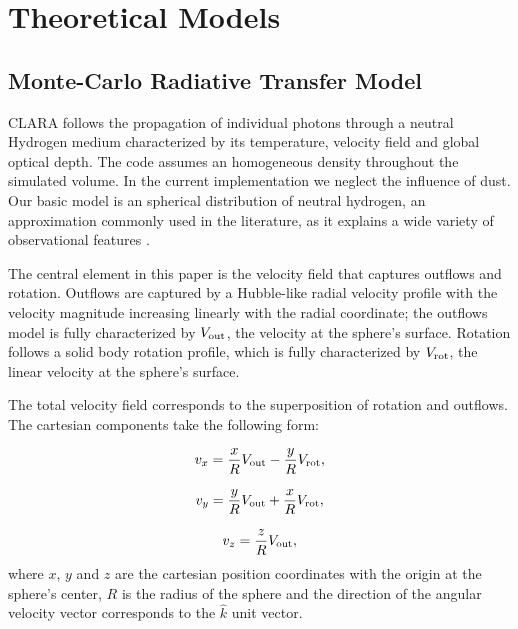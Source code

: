 \documentclass[a4paper,fleqn,usenatbib]{mnras}
\begin{document}
\section{Theoretical Models}
\label{sec:theory}

\subsection{Monte-Carlo Radiative Transfer Model}

CLARA follows the propagation of individual photons through a neutral
Hydrogen medium characterized by its temperature, velocity field and
global optical depth.
The code assumes an homogeneous density throughout the simulated
volume.
In the current implementation we neglect the influence of dust.
Our basic model is an spherical distribution of neutral hydrogen,
an approximation commonly used in the literature, as it explains a
wide variety of observational features \citep{Ahn03,Verhamme06,Dijkstra06}.


The central element in this paper is the velocity field that captures
outflows and rotation.
Outflows are captured by a Hubble-like radial velocity profile with
the velocity magnitude increasing linearly with the radial
coordinate; the outflows model is fully characterized by $V_{\rm out}$, the
velocity at the sphere's surface.
Rotation follows a solid body rotation profile, which is fully
characterized by $V_{\rm rot}$, the linear velocity at the sphere's surface.

The total velocity field corresponds to the superposition of rotation and
outflows.
The cartesian components take the following form:

\begin{equation}
	v_{x}=\frac{x}{R}V_{\rm out}-\frac{y}{R}V_{\rm rot} ,
	\label{eq:vx}
\end{equation}

\begin{equation}
	v_{y}=\frac{y}{R}V_{\rm out}+\frac{x}{R}V_{\rm rot} ,
	\label{eq:vy}
\end{equation}

\begin{equation}
	v_{z}=\frac{z}{R}V_{\rm out},
	\label{eq:vz}
\end{equation}
%
where $x$, $y$ and $z$ are the cartesian position coordinates with the
origin at the sphere's center, $R$ is the radius of the sphere and the
direction of the angular velocity vector corresponds to the $\hat{k}$
unit vector. 
\end{document}
